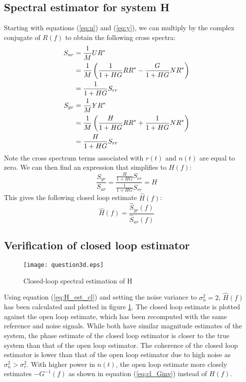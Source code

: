 \documentclass[11pt,a4paper]{article}
\begin{document}
\subsection{Spectral estimator for system H}
Starting with equations (\ref{eq:u}) and (\ref{eq:y}), we can multiply by the
complex conjugate of $R(f)$ to obtain the following cross spectra:
\begin{align}
    S_{ur} &= \frac{1}{M}UR^* \notag \\
           &= \frac{1}{M}\left(\frac{1}{1 + HG}RR^* -
                \frac{G}{1 + HG}NR^*\right) \notag \\
           &= \frac{1}{1 + HG}S_{rr} \label{eq:Sur} \\
    S_{yr} &= \frac{1}{M}YR^* \notag \\
           &= \frac{1}{M}\left(\frac{H}{1 + HG}RR^* +
                \frac{1}{1 + HG}NR^*\right) \notag \\
           &= \frac{H}{1 + HG}S_{rr} \label{eq:Srr}
\end{align}
Note the cross spectrum terms associated with $r(t)$ and $n(t)$ are equal to
zero. We can then find an expression that simplifies to $H(f)$:
\begin{equation}
    \frac{S_{yr}}{S_{ur}} =
    \frac{\frac{H}{1 + HG}S_{rr}}{\frac{1}{1 + HG}S_{rr}} = H
\end{equation}
This gives the following closed loop estimate $\hat{H}(f)$:
\begin{equation}
    \hat{H}(f) =
    \frac{\hat{S}_{yr}(f)}{\hat{S}_{ur}(f)} \label{eq:H_est_cl}
\end{equation}


\subsection{Verification of closed loop estimator}
\begin{figure}
    \begin{center}
        \texttt{[image: question3d.eps]}
    \end{center}
    \caption{Closed-loop spectral estimation of H}
    \label{fig:3d}
\end{figure}
Using equation (\ref{eq:H_est_cl}) and setting the noise variance to
$\sigma_n^2 = 2$, $\hat{H}(f)$ has been calculated and plotted in figure
\ref{fig:3d}. The closed loop estimate is plotted against the open loop
estimate, which has been recomputed with the same reference and noise signals.
While both have similar magnitude estimates of the system, the phase estimate
of the closed loop estimator is closer to the true system than that of the open
loop estimator. The coherence of the closed loop estimator is lower than that
of the open loop estimator due to high noise as $\sigma_n^2 > \sigma_r^2$. With
higher power in $n(t)$, the open loop estimate more closely estimates
$-G^{-1}(f)$ as shown in equation (\ref{eq:cl_Ginv}) instead of $H(f)$.
\end{document}
